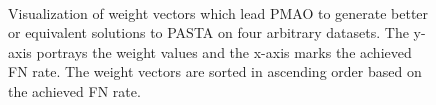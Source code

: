 \documentclass[a4paper,fleqn, review]{cas-dc}
\begin{document}
\begin{figure}[!htbp]\begin{adjustwidth}{-0.6cm}{}
		\centering
		\\
\end{adjustwidth}
	\caption{Visualization of weight vectors which lead PMAO to generate better or equivalent solutions to PASTA on four arbitrary datasets. The y-axis portrays the weight values and the x-axis marks the achieved FN rate. The weight vectors are sorted in ascending order based on the achieved FN rate. }
	\label{fig:good-weight}
\end{figure}
\end{document}
